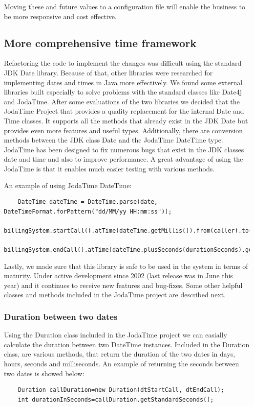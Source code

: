 \documentclass[pdftex,11pt,a4paper]{article}
\begin{document}
Moving these and future values to a configuration file will enable the business to be more responsive and cost effective.

\subsection{More comprehensive time framework}
Refactoring the code to implement the changes was difficult using the standard JDK Date library. Because of that, other libraries were researched for implementing dates and times in Java more effectively. We found some external libraries built especially to solve problems with the standard classes like Date4j and JodaTime. After some evaluations of the two libraries we decided that the JodaTime Project that provides a quality replacement for the internal Date and Time classes. It supports all the methods that already exist in the JDK Date but provides even more features and useful types. Additionally, there are conversion methods between the JDK class Date and the JodaTime DateTime type. JodaTime has been designed to fix numerous bugs that exist in the JDK classes date and time and also to improve performance. A great advantage of using the JodaTime is that it enables much easier testing with various methods. 

An example of using JodaTime DateTime:
\begin{lstlisting}
	DateTime dateTime = DateTime.parse(date, DateTimeFormat.forPattern("dd/MM/yy HH:mm:ss"));
	billingSystem.startCall().atTime(dateTime.getMillis()).from(caller).to(callee);
	billingSystem.endCall().atTime(dateTime.plusSeconds(durationSeconds).getMillis()).from(caller).to(callee);
\end{lstlisting}

Lastly, we made sure that this library is safe to be used in the system in terms of maturity. Under active development since 2002 (last release was in June this year) and it continues to receive new features and bug-fixes. Some other helpful classes and methods included in the JodaTime project are described next.

\subsubsection{Duration between two dates}
Using the Duration class included in the JodaTime project we can easially calculate the duration between two DateTime instances. Included in the Duration class, are various methods, that return the duration of the two dates in days, hours, seconds and milliseconds. An example of returning the seconds between two dates is showed below:
\begin{lstlisting}
	Duration callDuration=new Duration(dtStartCall, dtEndCall);
	int durationInSeconds=callDuration.getStandardSeconds();
\end{lstlisting}
\end{document}
